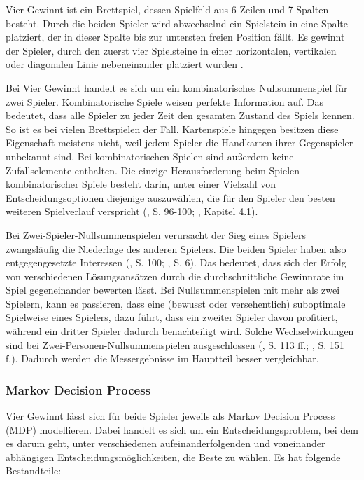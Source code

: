 \label{vier-gewinnt}

Vier Gewinnt ist ein Brettspiel, dessen Spielfeld aus 6 Zeilen und 7 Spalten besteht. Durch die beiden Spieler wird abwechselnd ein Spielstein in eine Spalte platziert, der in dieser Spalte bis zur untersten freien Position fällt. Es gewinnt der Spieler, durch den zuerst vier Spielsteine in einer horizontalen, vertikalen oder diagonalen Linie nebeneinander platziert wurden \cite{MiltonBradleyCompany.1990}.

Bei Vier Gewinnt handelt es sich um ein kombinatorisches Nullsummenspiel für zwei Spieler. Kombinatorische Spiele weisen \glqq perfekte Information\grqq{} auf. Das bedeutet, dass alle Spieler zu jeder Zeit den gesamten Zustand des Spiels kennen. So ist es bei vielen Brettspielen der Fall. Kartenspiele hingegen besitzen diese Eigenschaft meistens nicht, weil jedem Spieler die Handkarten ihrer Gegenspieler unbekannt sind. Bei kombinatorischen Spielen sind außerdem keine Zufallselemente enthalten. Die einzige Herausforderung beim Spielen kombinatorischer Spiele besteht darin, unter einer Vielzahl von Entscheidungsoptionen diejenige auszuwählen, die für den Spieler den besten weiteren Spielverlauf verspricht (\cite{Bewersdorff.2018}, S. 96-100; \cite{Ferguson.January2019}, Kapitel 4.1).

Bei Zwei-Spieler-Nullsummenspielen verursacht der Sieg eines Spielers zwangsläufig die Niederlage des anderen Spielers. Die beiden Spieler haben also entgegengesetzte Interessen (\cite{Bewersdorff.2018}, S. 100; \cite{Allis.1994}, S. 6). Das bedeutet, dass sich der Erfolg von verschiedenen Lösungsansätzen durch die durchschnittliche Gewinnrate im Spiel gegeneinander bewerten lässt. Bei Nullsummenspielen mit mehr als zwei Spielern, kann es passieren, dass eine (bewusst oder versehentlich) suboptimale Spielweise eines Spielers, dazu führt, dass ein zweiter Spieler davon profitiert, während ein dritter Spieler dadurch benachteiligt wird. Solche Wechselwirkungen sind bei Zwei-Personen-Nullsummenspielen ausgeschlossen (\cite{Bewersdorff.2018}, S. 113 ff.; \cite{Russell.2020}, S. 151 f.). Dadurch werden die Messergebnisse im Hauptteil besser vergleichbar.

\subsubsection{Markov Decision Process}

Vier Gewinnt lässt sich für beide Spieler jeweils als Markov Decision Process (MDP) modellieren. Dabei handelt es sich um ein Entscheidungsproblem, bei dem es darum geht, unter verschiedenen aufeinanderfolgenden und voneinander abhängigen Entscheidungsmöglichkeiten, die Beste zu wählen. Es hat folgende Bestandteile:

